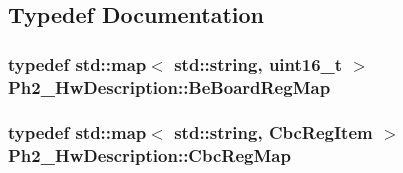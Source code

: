 \subsection{Typedef Documentation}
\hypertarget{namespace_ph2___hw_description_a2e13fb82c8ed98154c60f9d0f8467d72}{
\subsubsection[{Be\-Board\-Reg\-Map}]{\setlength{\rightskip}{0pt plus 5cm}typedef std\-::map$<$ std\-::string, uint16\-\_\-t $>$ {\bf Ph2\-\_\-\-Hw\-Description\-::\-Be\-Board\-Reg\-Map}}}\label{namespace_ph2___hw_description_a2e13fb82c8ed98154c60f9d0f8467d72}
\hypertarget{namespace_ph2___hw_description_a9a23b373068f169aa67ca1d22c9a6001}{
\subsubsection[{Cbc\-Reg\-Map}]{\setlength{\rightskip}{0pt plus 5cm}typedef std\-::map$<$ std\-::string, {\bf Cbc\-Reg\-Item} $>$ {\bf Ph2\-\_\-\-Hw\-Description\-::\-Cbc\-Reg\-Map}}}\label{namespace_ph2___hw_description_a9a23b373068f169aa67ca1d22c9a6001}
